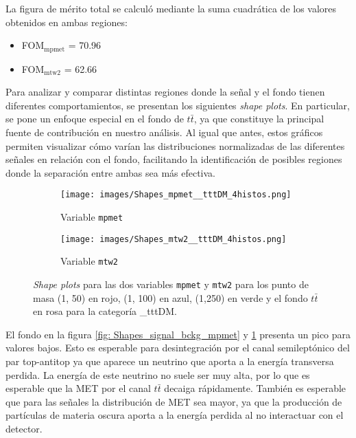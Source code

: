 La figura de mérito total se calculó mediante la suma cuadrática de los valores obtenidos en ambas regiones:

\begin{itemize}
    \item FOM$_\text{mpmet}$ = 70.96
    \item FOM$_\text{mtw2}$ = 62.66
\end{itemize}

Para analizar y comparar distintas regiones donde la señal y el fondo tienen diferentes comportamientos, se presentan los siguientes \textit{shape plots}. En particular, se pone un enfoque especial en el fondo de $t\bar{t}$, ya que constituye la principal fuente de contribución en nuestro análisis. Al igual que antes, estos gráficos permiten visualizar cómo varían las distribuciones normalizadas de las diferentes señales en relación con el fondo, facilitando la identificación de posibles regiones donde la separación entre ambas sea más efectiva.\\
\newpage

\begin{figure}[h!]
     \centering
     \begin{subfigure}[b]{0.43\textwidth}
         \centering
         \texttt{[image: images/Shapes\_mpmet\_\_tttDM\_4histos.png]}
         \caption{Variable \texttt{mpmet}}
         \label{fig: Shapes_4histos_mpmet_tttDM}
     \end{subfigure}
     \begin{subfigure}[b]{0.43\textwidth}
         \centering
    \texttt{[image: images/Shapes\_mtw2\_\_tttDM\_4histos.png]}
         \caption{Variable \texttt{mtw2}}
         \label{fig: Shapes_4histos_mtw2_tttDM}
     \end{subfigure}
     \hfill
     \caption{\textit{Shape plots} para las dos variables \texttt{mpmet} y \texttt{mtw2} para los punto de masa (1, 50) en rojo, (1, 100) en azul, (1,250) en verde y el fondo $t\bar{t}$ en rosa para la categoría \_tttDM.}
     \label{fig:Shapes_4histos}
\end{figure}

El fondo en la figura \ref{fig: Shapes_signal_bckg_mpmet} y \ref{fig: Shapes_4histos_mpmet_tttDM} presenta un pico para valores bajos. Esto es esperable para desintegración por el canal semileptónico del par top-antitop ya que aparece un neutrino que aporta a la energía transversa perdida. La energía de este neutrino no suele ser muy alta, por lo que es esperable que la MET por el canal $t\bar{t}$ decaiga rápidamente. También es esperable que para las señales la distribución de MET sea mayor, ya que la producción de partículas de materia oscura aporta a la energía perdida al no interactuar con el detector.\\

